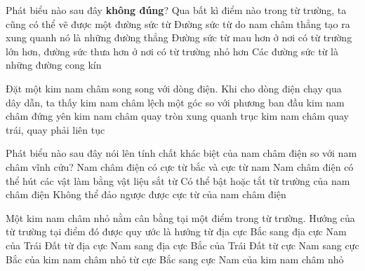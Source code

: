 \begin{ex}
Phát biểu nào sau đây \textbf{không đúng}?	
	\choice
	{Qua bất kì điểm nào trong từ trường, ta cũng có thể vẽ được một đường sức từ}
	{\True Đường sức từ do nam châm thẳng tạo ra xung quanh nó là những đường thẳng}
	{Đường sức từ mau hơn ở nơi có từ trường lớn hơn, đường sức thưa hơn ở nơi có từ trường nhỏ hơn}
	{Các đường sức từ là những đường cong kín}
	\loigiai{}
\end{ex}
\begin{ex}
	Đặt một kim nam châm song song với dòng điện. Khi cho dòng điện chạy qua dây dẫn, ta thấy
	\choice
	{\True kim nam châm lệch một góc so với phương ban đầu}
	{kim nam châm đứng yên}
	{kim nam châm quay tròn xung quanh trục}
	{kim nam châm quay trái, quay phải liên tục}
	\loigiai{}
\end{ex}
\begin{ex}
	Phát biểu nào sau đây nói lên tính chất khác biệt của nam châm điện so với nam châm vĩnh cửu?
	\choice
	{Nam châm điện có cực từ bắc và cực từ nam}
	{Nam châm điện có thể hút các vật làm bằng vật liệu sắt từ}
	{\True Có thể bật hoặc tắt từ trường của nam châm điện}
	{Không thể đảo ngược được cực từ của nam châm điện}
	\loigiai{}
\end{ex}
\begin{ex}
Một kim nam châm nhỏ nằm cân bằng tại một điểm trong từ trường. Hướng của từ trường tại điểm đó được quy ước là hướng	
	\choice
	{từ địa cực Bắc sang địa cực Nam của Trái Đất}
	{từ địa cực Nam sang địa cực Bắc của Trái Đất}
	{\True từ cực Nam sang cực Bắc của kim nam châm nhỏ}
	{từ cực Bắc sang cực Nam của kim nam châm nhỏ}
	\loigiai{}
\end{ex}


